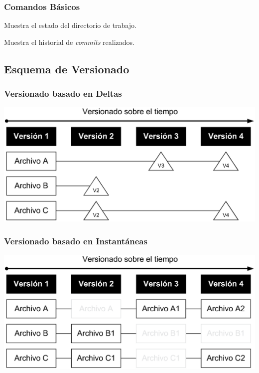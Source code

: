 \documentclass[hanbdout,a4paper,slidestop,dvips,xcolor=pst,blue]{beamer}
\begin{document}
\begin{frame}[c]
	\frametitle{Comandos Básicos}
	 \begin{description}[<+->]
        \item[status] Muestra el estado del directorio de trabajo.
        \item[log] Muestra el historial de \emph{commits} realizados.
	 \end{description}
\end{frame}

\subsection{Esquema de Versionado}

\begin{frame}[c]
	\frametitle{Versionado basado en Deltas}
	 \begin{center}
		\includegraphics[width=\linewidth,keepaspectratio=true]{images/git/deltas.eps}
	 \end{center}
\end{frame}

\begin{frame}[c]
	\frametitle{Versionado basado en Instantáneas}
	 \begin{center}
		\includegraphics[width=\linewidth,keepaspectratio=true]{images/git/snapshots.eps}
	 \end{center}
\end{frame}
\end{document}
